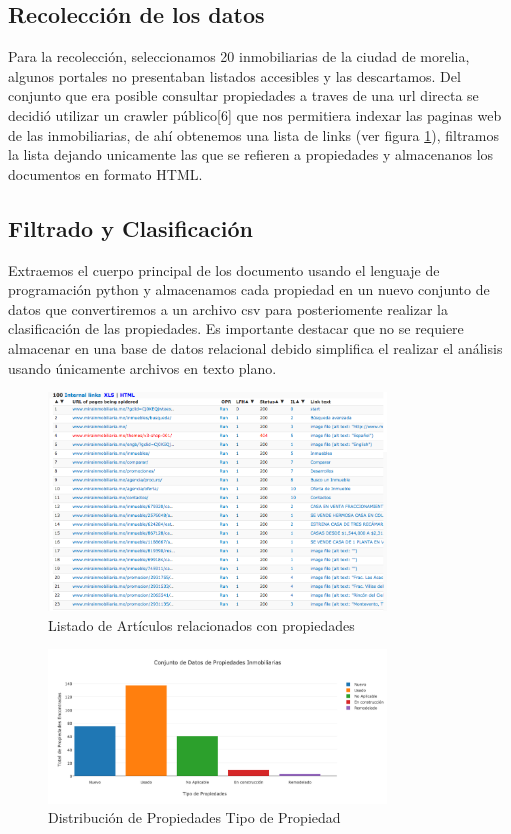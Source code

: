 \subsection{Recolección de los datos}

Para la recolección, seleccionamos 20 inmobiliarias de la ciudad de morelia, algunos portales no presentaban listados accesibles y las descartamos. Del conjunto que era posible consultar propiedades a traves de una url directa se decidió  utilizar un crawler público{[}6{]} que nos permitiera indexar las paginas web de las inmobiliarias, de ahí obtenemos una lista de links (ver figura \ref{fig:CrawlerList}), filtramos la lista dejando unicamente las que se refieren a propiedades y almacenanos los documentos en formato HTML. 
\subsection{Filtrado y Clasificación}

Extraemos el cuerpo principal de los documento usando el lenguaje de programación python y almacenamos cada propiedad en un nuevo conjunto de datos  que convertiremos a un archivo csv para posteriomente  realizar la clasificación de las propiedades. Es importante destacar que no se requiere almacenar en una base de datos relacional debido simplifica  el realizar el análisis usando únicamente archivos en texto plano.


\begin{figure}[ht]
\centering
\includegraphics[width=0.8\textwidth]{CrawlerSite.png}
\caption{Listado de Artículos relacionados con propiedades}
\label{fig:CrawlerList}
\end{figure}


\begin{figure}[ht]
\centering
\includegraphics[width=0.8\textwidth]{PropiedadesInmobiliariasEstadoVivienda.png}
\caption{Distribución de Propiedades Tipo de Propiedad}
\label{fig:PropiedadesType}
\end{figure}

